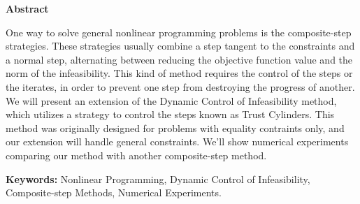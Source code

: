 \begin{center}
  \large{\textbf{Abstract}}
\end{center}

One way to solve general nonlinear programming problems is the composite-step
strategies.  These strategies usually combine a step tangent to the constraints
and a normal step, alternating between reducing the objective function value and
the norm of the infeasibility.  This kind of method requires the control of the
steps or the iterates, in order to prevent one step from destroying
the progress of another. We will present an extension of the Dynamic Control of
Infeasibility method, which utilizes a strategy to control the steps known as
Trust Cylinders. This method was originally designed for problems with equality
contraints
only, and our extension will handle general constraints. We'll show numerical
experiments comparing our method with another composite-step method.

\vspace{.5 cm}
\textbf{Keywords:} Nonlinear Programming, Dynamic Control of Infeasibility,
Composite-step Methods, Numerical Experiments.
